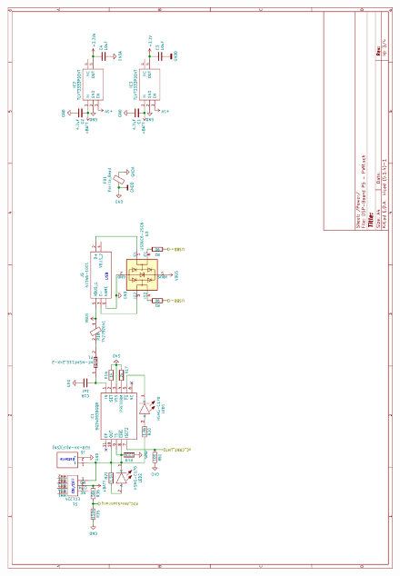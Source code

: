 \begin{appendix}
\begin{figure}[h]
	\centering
	\includegraphics[width=0.95\linewidth]{appendix/DSP-Board Schema V1-1 (3).pdf}
\end{figure}


\end{appendix}
